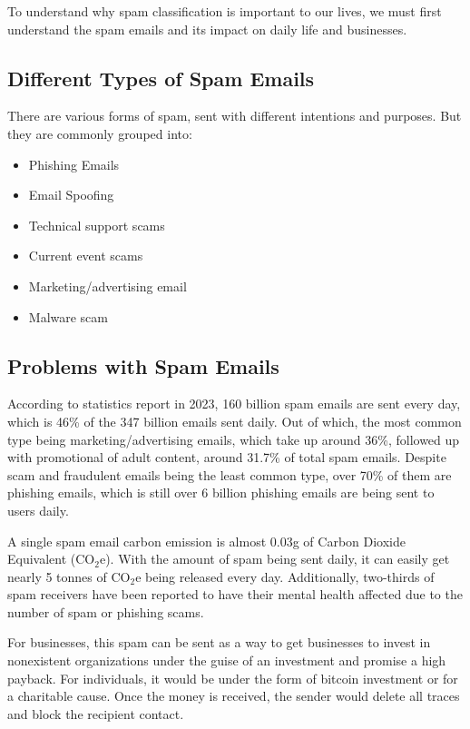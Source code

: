 To understand why spam classification is important to our lives, we must first understand the spam emails and its impact on daily life and businesses.

\subsection{Different Types of Spam Emails}
\label{subsec:different-types-of-spam-emails}

There are various forms of spam, sent with different intentions and purposes.
But they are commonly grouped into:

\begin{itemize}
    \item Phishing Emails
    \item Email Spoofing
    \item Technical support scams
    \item Current event scams
    \item Marketing/advertising email
    \item Malware scam
\end{itemize}

\subsection{Problems with Spam Emails}
\label{subsec:problems-with-spam-emails}

According to statistics report in 2023, 160 billion spam emails are sent every day, which is 46\% of the 347 billion emails sent daily.
Out of which, the most common type being marketing/advertising emails, which take up around 36\%, followed up with promotional of adult content, around 31.7\% of total spam emails.
Despite scam and fraudulent emails being the least common type, over 70\% of them are phishing emails, which is still over 6 billion phishing emails are being sent to users daily.

A single spam email carbon emission is almost 0.03g of Carbon Dioxide Equivalent (CO$_{2}$e).
With the amount of spam being sent daily, it can easily get nearly 5 tonnes of CO$_{2}$e being released every day.
Additionally, two-thirds of spam receivers have been reported to have their mental health affected due to the number of spam or phishing scams.

For businesses, this spam can be sent as a way to get businesses to invest in nonexistent organizations under the guise of an investment and promise a high payback.
For individuals, it would be under the form of bitcoin investment or for a charitable cause.
Once the money is received, the sender would delete all traces and block the recipient contact.